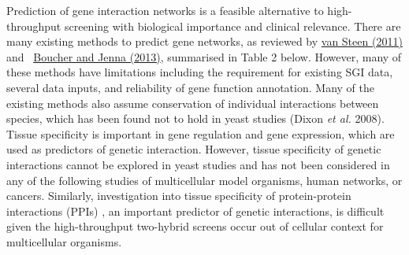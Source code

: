 Prediction of gene interaction networks is a feasible alternative to high-throughput screening with biological importance and clinical relevance. There are many existing methods to predict gene networks, as reviewed by \hyperlink{ENREF104}{van Steen (2011)} and \ \hyperlink{ENREF16}{Boucher and Jenna (2013)}, summarised in Table 2 below. However, many of these methods have limitations including the requirement for existing SGI data, several data inputs, and reliability of gene function annotation. Many of the existing methods also assume conservation of individual interactions between species, which has been found not to hold in yeast studies (Dixon\textit{ et al.} 2008). Tissue specificity is important in gene regulation and gene expression, which are used as predictors of genetic interaction. However, tissue specificity of genetic interactions cannot be explored in yeast studies and has not been considered in any of the following studies of multicellular model organisms, human networks, or cancers. Similarly, investigation into tissue specificity of protein-protein interactions (PPIs) , an important predictor of genetic interactions, is difficult given the high-throughput two-hybrid screens occur out of cellular context for multicellular organisms.  

